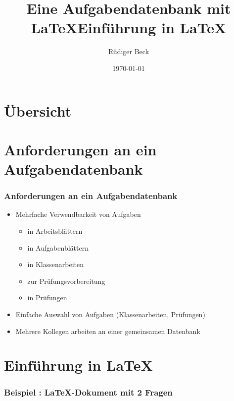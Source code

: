 \documentclass{beamer}
\title{Eine Aufgabendatenbank mit \LaTeX}
\author{Rüdiger Beck}
\date{\today}
\newcounter{beispiel}
\begin{document}
\frame{\titlepage}

\section*{Übersicht}
\frame{\tableofcontents}

\section{Anforderungen an ein Aufgabendatenbank}
\begin{frame}
  \frametitle{Anforderungen an ein Aufgabendatenbank}
    \begin{itemize}
      \item<1-> Mehrfache Verwendbarkeit von Aufgaben
        \begin{itemize}
        \item<2-> in Arbeitsblättern
        \item<3-> in Aufgabenblättern
        \item<4-> in Klassenarbeiten
        \item<5-> zur Prüfungsvorbereitung
        \item<6-> in Prüfungen
        \end{itemize}
      \item<7-> Einfache Auswahl von Aufgaben (Klassenarbeiten, Prüfungen)
      \item<8-> Mehrere Kollegen arbeiten an einer gemeinsamen Datenbank      
    \end{itemize}
\end{frame}


\section{Einführung in \LaTeX}



\title{Einführung in \LaTeX}
\author{}
\date{}
\frame{\titlepage}


\begin{frame}[fragile]
  \frametitle{Beispiel \thebeispiel : \LaTeX -Dokument mit 2 Fragen}
  
\end{frame}
\end{document}
